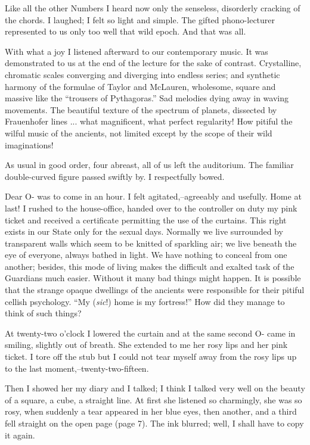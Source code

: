 \documentclass[11pt,openany]{book}
\begin{document}
Like all the other Numbers I heard now only the senseless, disorderly cracking of the chords. I laughed; I felt so light and simple. The gifted phono-lecturer represented to us only too well that wild epoch. And that was all.

With what a joy I listened afterward to our contemporary music. It was demonstrated to us at the end of the lecture for the sake of contrast. Crystalline, chromatic scales converging and diverging into endless series; and synthetic harmony of the formulae of Taylor and McLauren, wholesome, square and massive like the ``trousers of Pythagoras.'' Sad melodies dying away in waving movements. The beautiful texture of the spectrum of planets, dissected by Frauenhofer lines ... what magnificent, what perfect regularity! How pitiful the wilful music of the ancients, not limited except by the scope of their wild imaginations!

As usual in good order, four abreast, all of us left the auditorium. The familiar double-curved figure passed swiftly by. I respectfully bowed.

Dear O- was to come in an hour. I felt agitated,--agreeably and usefully. Home at last! I rushed to the house-office, handed over to the controller on duty my pink ticket and received a certificate permitting the use of the curtains. This right exists in our State only for the sexual days. Normally we live surrounded by transparent walls which seem to be knitted of sparkling air; we live beneath the eye of everyone, always bathed in light. We have nothing to conceal from one another; besides, this mode of living makes the difficult and exalted task of the Guardians much easier. Without it many bad things might happen. It is possible that the strange opaque dwellings of the ancients were responsible for their pitiful cellish psychology. ``My (\emph{sic}!) home is my fortress!'' How did they manage to think of such things?

At twenty-two o'clock I lowered the curtain and at the same second O- came in smiling, slightly out of breath. She extended to me her rosy lips and her pink ticket. I tore off the stub but I could not tear myself away from the rosy lips up to the last moment,--twenty-two-fifteen.

Then I showed her my diary and I talked; I think I talked very well on the beauty of a square, a cube, a straight line. At first she listened so charmingly, she was so rosy, when suddenly a tear appeared in her blue eyes, then another, and a third fell straight on the open page (page 7). The ink blurred; well, I shall have to copy it again.
\end{document}
